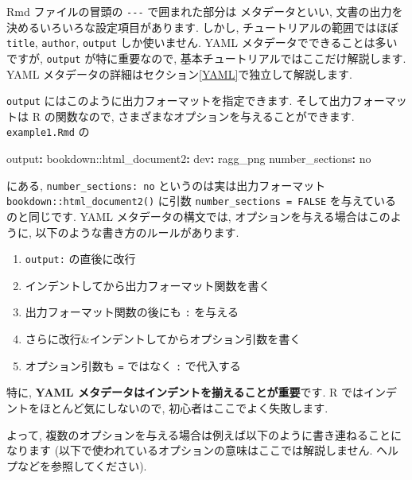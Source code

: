 \documentclass[
]{ltjsarticle}
\newenvironment{Shaded}{\begin{snugshade}}{\end{snugshade}}
\newcommand{\AttributeTok}[1]{\textcolor[rgb]{0.77,0.63,0.00}{#1}}
\newcommand{\CharTok}[1]{\textcolor[rgb]{0.31,0.60,0.02}{#1}}
\newcommand{\FunctionTok}[1]{\textcolor[rgb]{0.00,0.00,0.00}{#1}}
\newcommand{\KeywordTok}[1]{\textcolor[rgb]{0.13,0.29,0.53}{\textbf{#1}}}
\providecommand{\tightlist}{%
  \setlength{\itemsep}{0pt}\setlength{\parskip}{0pt}}
\begin{document}
Rmd ファイルの冒頭の \texttt{-\/-\/-} で囲まれた部分は  メタデータといい, 文書の出力を決めるいろいろな設定項目があります. しかし, チュートリアルの範囲ではほぼ \texttt{title}, \texttt{author}, \texttt{output} しか使いません. YAML メタデータでできることは多いですが, \texttt{output} が特に重要なので, 基本チュートリアルではここだけ解説します. YAML メタデータの詳細はセクション\ref{YAML}で独立して解説します.

\texttt{output} にはこのように出力フォーマットを指定できます. そして出力フォーマットは R の関数なので, さまざまなオプションを与えることができます. \texttt{example1.Rmd} の

\begin{Shaded}
\begin{Highlighting}[]
\FunctionTok{output}\KeywordTok{:}
\AttributeTok{  bookdown:}\FunctionTok{:html\_document2}\KeywordTok{:}
\AttributeTok{    }\FunctionTok{dev}\KeywordTok{:}\AttributeTok{ ragg\_png}
\AttributeTok{    }\FunctionTok{number\_sections}\KeywordTok{:}\AttributeTok{ }\CharTok{no}
\end{Highlighting}
\end{Shaded}

にある, \texttt{number\_sections:\ no} というのは実は出力フォーマット \texttt{bookdown::html\_document2()} に引数 \texttt{number\_sections\ =\ FALSE} を与えているのと同じです. YAML メタデータの構文では, オプションを与える場合はこのように, 以下のような書き方のルールがあります.

\begin{enumerate}
\def\labelenumi{\arabic{enumi}.}
\tightlist
\item
  \texttt{output:} の直後に改行
\item
  インデントしてから出力フォーマット関数を書く
\item
  出力フォーマット関数の後にも \texttt{:} を与える
\item
  さらに改行\&インデントしてからオプション引数を書く
\item
  オプション引数も \texttt{=} ではなく \texttt{:} で代入する
\end{enumerate}

特に, \textbf{YAML メタデータはインデントを揃えることが重要}です. R ではインデントをほとんど気にしないので, 初心者はここでよく失敗します.

よって, 複数のオプションを与える場合は例えば以下のように書き連ねることになります (以下で使われているオプションの意味はここでは解説しません. ヘルプなどを参照してください).
\end{document}
